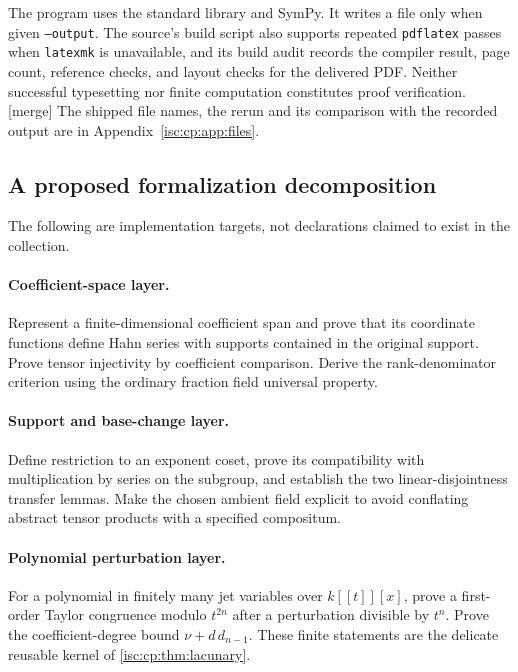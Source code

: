 \documentclass[11pt,letterpaper]{article}
\theoremstyle{definition}
\theoremstyle{remark}
\newcommand{\mtag}{\textup{[merge]}}%
\numberwithin{equation}{section}
\begin{document}
The program uses the standard library and SymPy. It writes a file only when
given \texttt{--output}. The source's build script also supports repeated
\texttt{pdflatex} passes when \texttt{latexmk} is unavailable, and its build
audit records the compiler result, page count, reference checks, and layout
checks for the delivered PDF. Neither successful typesetting nor finite
computation constitutes proof verification. \mtag{} The shipped file names,
the rerun and its comparison with the recorded output are in
Appendix~\ref{isc:cp:app:files}.

\subsection{A proposed formalization decomposition}\label{isc:cp:sub:formal}

The following are implementation targets, not declarations claimed to exist
in the collection.

\paragraph{Coefficient-space layer.}
Represent a finite-dimensional coefficient span and prove that its
coordinate functions define Hahn series with supports contained in the
original support. Prove tensor injectivity by coefficient comparison.
Derive the rank-denominator criterion using the ordinary fraction field
universal property.

\paragraph{Support and base-change layer.}
Define restriction to an exponent coset, prove its compatibility with
multiplication by series on the subgroup, and establish the two
linear-disjointness transfer lemmas. Make the chosen ambient field explicit
to avoid conflating abstract tensor products with a specified compositum.

\paragraph{Polynomial perturbation layer.}
For a polynomial in finitely many jet variables over $k[[t]][x]$, prove a
first-order Taylor congruence modulo $t^{2n}$ after a perturbation divisible
by $t^n$. Prove the coefficient-degree bound $\nu+d\,d_{n-1}$. These finite
statements are the delicate reusable kernel of \cref{isc:cp:thm:lacunary}.
\end{document}
